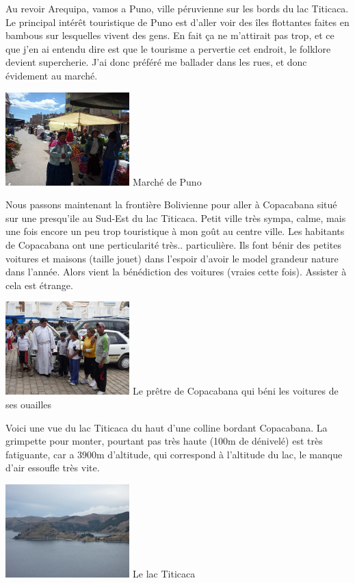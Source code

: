 \begin{multicols}{2}
Au revoir Arequipa, vamos a Puno, ville péruvienne sur les bords du lac Titicaca. Le principal intérêt touristique de Puno est d'aller voir des îles flottantes faites en bambous sur lesquelles vivent des gens. En fait ça ne m'attirait pas trop, et ce que j'en ai entendu dire est que le tourisme a pervertie cet endroit, le folklore devient supercherie. J'ai donc préféré me ballader dans les rues, et donc évidement au marché.

\hspace*{-0.65cm}
\includegraphics[width=4.8cm]{articles/Arequipa-colca-titicaca/12566069210hdx.jpg}
Marché de Puno

Nous passons maintenant la frontière Bolivienne pour aller à Copacabana situé sur une presqu'ile au Sud-Est du lac Titicaca. Petit ville très sympa, calme, mais une fois encore un peu trop touristique à mon goût au centre ville. Les habitants de Copacabana ont une perticularité très.. particulière. Ils font bénir des petites voitures et maisons (taille jouet) dans l'espoir d'avoir le model grandeur nature dans l'année. Alors vient la bénédiction des voitures (vraies cette fois). Assister à cela est étrange.

\hspace*{-0.65cm}
\includegraphics[width=4.8cm]{articles/Arequipa-colca-titicaca/1256606967Syll.jpg}
Le prêtre de Copacabana qui béni les voitures de ses ouailles

Voici une vue du lac Titicaca du haut d'une colline bordant Copacabana. La grimpette pour monter, pourtant pas très haute (100m de dénivelé) est très fatiguante, car a 3900m d'altitude, qui correspond à l'altitude du lac, le manque d'air essoufle très vite.

\hspace*{-0.65cm}
\includegraphics[width=4.8cm]{articles/Arequipa-colca-titicaca/125660697038LL.jpg}
Le lac Titicaca


\end{multicols}
